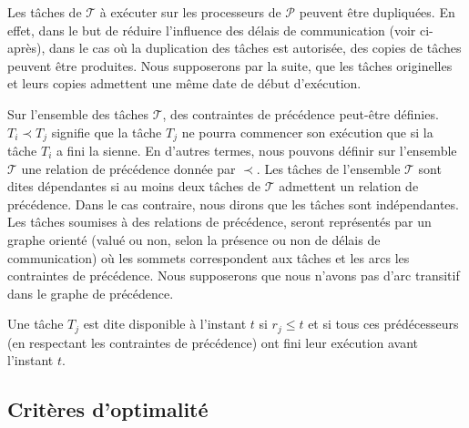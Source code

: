 \documentclass[a4paper,11pt]{article}
\begin{document}

Les tâches de $\mathcal{T}$ à exécuter sur les processeurs de $\mathcal{P}$ peuvent être dupliquées.
En effet, dans le but de réduire l'influence des délais de communication (voir ci-après), dans le
cas où la duplication des tâches est autorisée, des copies de tâches peuvent être produites. Nous
supposerons par la suite, que les tâches originelles et leurs copies  admettent une même date de
début d'exécution.

Sur l'ensemble des tâches $\mathcal{T}$, des contraintes de précédence peut-être définies. $T_i
\prec T_j$ signifie que la tâche $T_j$ ne pourra commencer son exécution que si la tâche $T_i$ a
fini la sienne. En d'autres termes, nous pouvons définir sur l'ensemble $\mathcal{T}$ une relation
de précédence donnée par $\prec$. Les tâches de l'ensemble $\mathcal{T}$ sont dites dépendantes si
au moins deux tâches de $\mathcal{T}$ admettent un relation de précédence. Dans le cas contraire,
nous dirons que les tâches sont indépendantes.
Les tâches soumises à des relations de précédence, seront représentés par un graphe orienté (valué
ou non, selon la présence ou non de délais de communication) où les sommets correspondent aux tâches
et les arcs les contraintes de précédence. Nous supposerons que nous n'avons pas d'arc transitif
dans le graphe de précédence.


Une tâche $T_j$ est dite disponible à l'instant $t$ si $r_j \leq t$ et  si tous ces prédécesseurs
(en respectant les contraintes de précédence) ont fini leur exécution avant l'instant $t$.

\subsection{Critères d'optimalité}
\end{document}
